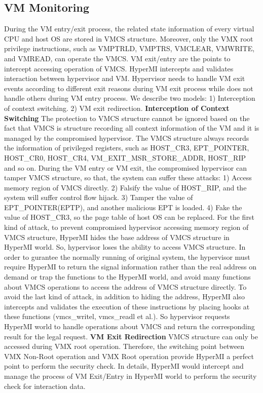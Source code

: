 \documentclass[conference]{IEEEtran}
\begin{document}
\subsection{VM Monitoring}
During the VM entry/exit process, the related state information of every virtual CPU and host OS are stored in VMCS structure. 
Moreover, only the VMX root privilege instructions, such as VMPTRLD, VMPTRS, VMCLEAR, VMWRITE, and VMREAD, can operate the VMCS.
VM exit/entry are the points to intercept accessing operation of VMCS. HyperMI intercepts and validates interaction between hypervisor and VM. Hypervisor needs to handle VM exit events according to different exit reasons during VM exit process while does not handle others during VM entry process. We describe two models: 1) Interception of context switching. 2) VM exit redirection.
\textbf{Interception of Context Switching}
The protection to VMCS structure cannot be ignored based on the fact that VMCS is structure recording all context information of the VM and it is managed by the compromised hypervisor. 
The VMCS structure always records the information of privileged registers, such as HOST\_CR3, EPT\_POINTER, HOST\_CR0, HOST\_CR4, VM\_EXIT\_MSR\_STORE\_ADDR, HOST\_RIP and so on. During the VM entry or VM exit, the compromised hypervisor can tamper VMCS structure, so that, the system can suffer these attacks: 1) Access memory region of VMCS directly. 2) Falsify the value of HOST\_RIP, and the system will suffer control flow hijack. 3) Tamper the value of EPT\_POINTER(EPTP), and another malicious EPT is loaded. 4) Fake the value of HOST\_CR3, so the page table of host OS can be replaced.
For the first kind of attack, to prevent compromised hypervisor accessing memory region of VMCS structure, HyperMI hides the base address of VMCS structure in HyperMI world. So, hypervisor loses the ability to access VMCS structure. In order to gurantee the normally running of original system, the hypervisor must require HyperMI to return the signal information rather than the real address on demand or trap the functions to the HyperMI world, and avoid many functions about VMCS operations to access the address of VMCS structure directly. To avoid the last kind of attack, in addition to hiding the address, HyperMI also intercepts and validates the execution of these instructions by placing hooks at these functions (vmcs\_writel, vmcs\_readl et al.). So hypervisor requests HyperMI world to handle operations about VMCS and return the corresponding result for the legal request.
\textbf{VM Exit Redirection}
VMCS structure can only be accessed during VMX root operation. Therefore, the switching point between VMX Non-Root operation and VMX Root operation provide HyperMI a perfect point to perform the security check. In details, HyperMI would intercept and manage the process of VM Exit/Entry in HyperMI world to perform the security check for interaction data. 
\end{document}
